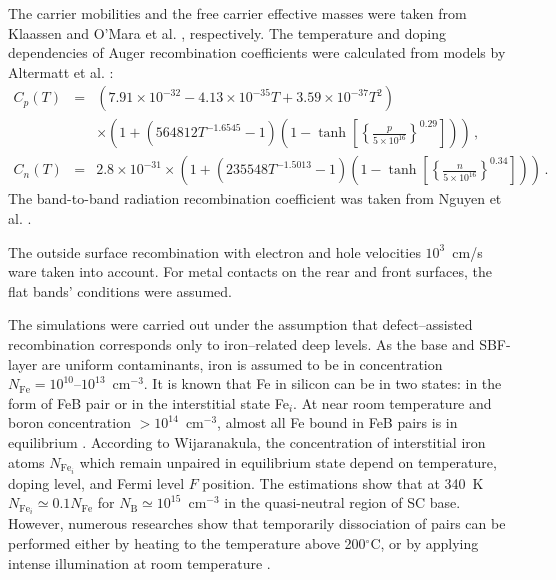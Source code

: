 \documentclass[num-refs]{wiley-article} %
\begin{document}
The carrier mobilities and the free carrier effective masses  were taken from Klaassen \cite{KLAASSEN953}
and O'Mara et al. \cite{OMara}, respectively.
The temperature and doping dependencies of Auger recombination coefficients were calculated from models by Altermatt et al. \cite{Si_Auger}:
\begin{eqnarray}
   \nonumber C_{p} (T)&=& (7.91\times10^{-32}-4.13\times10^{-35}T+3.59\times10^{-37}T^2)\\
  &&\times\left(1+\left(564812T^{-1.6545}-1\right)\left(1-\tanh\left[\left\{\frac{p}{5\times10^{16}}\right\}^{0.29}\right]\right)\right)\,, \\
   C_{n} (T)&=& 2.8\times10^{-31}
  \times\left(1+\left(235548T^{-1.5013}-1\right)\left(1-\tanh\left[\left\{\frac{n}{5\times10^{16}}\right\}^{0.34}\right]\right)\right)\,.
\end{eqnarray}
The band-to-band radiation recombination coefficient was taken from Nguyen et al. \cite{Si_BtB}.

The outside surface recombination with electron and hole velocities $10^3$~cm/s ware taken into account.
For metal contacts on the rear and front surfaces,
the flat bands' conditions were assumed. 


The simulations were carried out under the assumption that defect–assisted recombination corresponds only to iron–related deep levels.
As the base and SBF-layer are uniform contaminants, iron is assumed to be in concentration
$N_{\mathrm{Fe}}=10^{10}$--$10^{13}$~cm$^{-3}$.
It is known that Fe in silicon can be in two states:
in the form of FeB pair or in the interstitial state Fe$_i$.
At near room temperature and boron concentration $>10^{14}$~cm$^{-3}$,
almost all Fe bound in FeB pairs is in equilibrium \cite{FeB:kinetic,FeBAssJAP2014,FeBAssSST2011,FeBJAP2005}.
According to Wijaranakula\cite{FeB:kinetic},
the concentration of interstitial iron atoms $N_{\mathrm{Fe}_i}$ which
remain unpaired in equilibrium state depend on temperature, doping level,
and Fermi level $F$ position.
The estimations show that at 340~K  $N_{\mathrm{Fe}_i}\simeq0.1 N_\mathrm{Fe}$
for $N_\mathrm{B}\simeq10^{15}$~cm$^{-3}$ in the quasi-neutral
region of SC base.
However, numerous researches show that temporarily dissociation of pairs can be performed either
by heating to the temperature above 200$^\circ$C,
or by applying intense illumination at room temperature \cite{FeBAssJAP2014,FeBJAP2005}.
\end{document}
